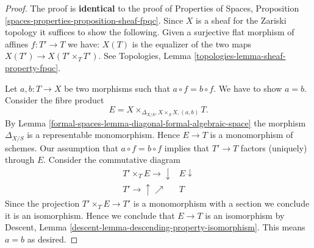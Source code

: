 \begin{proof}
The proof is {\bf identical} to the proof of
Properties of Spaces, Proposition
\ref{spaces-properties-proposition-sheaf-fpqc}.
Since $X$ is a sheaf for the Zariski topology it
suffices to show the following. Given a surjective
flat morphism of affines $f : T' \to T$ we have:
$X(T)$ is the equalizer of the two maps $X(T') \to X(T' \times_T T')$.
See Topologies, Lemma \ref{topologies-lemma-sheaf-property-fpqc}.

\medskip\noindent
Let $a, b : T \to X$ be two morphisms such that $a \circ f = b \circ f$.
We have to show $a = b$. Consider the fibre product
$$
E = X \times_{\Delta_{X/S}, X \times_S X, (a, b)} T.
$$
By Lemma \ref{formal-spaces-lemma-diagonal-formal-algebraic-space}
the morphism $\Delta_{X/S}$ is a representable monomorphism. Hence
$E \to T$ is a monomorphism of schemes. Our assumption that
$a \circ f = b \circ f$ implies that $T' \to T$ factors (uniquely) through $E$.
Consider the commutative diagram
$$
\begin{array}{cc}T' \times_T E \longrightarrow\downarrow & E \downarrow \\ T' \longrightarrow\uparrow\nearrow & T\end{array}
$$
Since the projection $T' \times_T E \to T'$ is a monomorphism
with a section we conclude it is an isomorphism. Hence we conclude that
$E \to T$ is an isomorphism by
Descent, Lemma \ref{descent-lemma-descending-property-isomorphism}.
This means $a = b$ as desired.


\end{proof}
